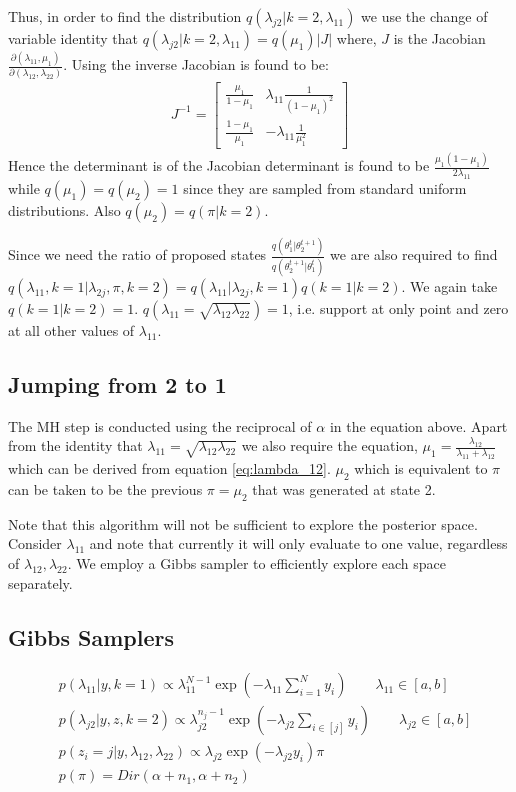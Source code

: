 \documentclass{article}
\begin{document}
Thus, in order to find the distribution $q(\lambda_{j2}\vert k=2,\lambda_{11})$ we use the change of variable identity that $q(\lambda_{j2}\vert k=2,\lambda_{11})=q(\mu_1)\vert J\vert$ where, $J$ is the Jacobian $\frac{\partial(\lambda_{11},\mu_1)}{\partial(\lambda_{12},\lambda_{22})}$. Using  the inverse Jacobian is found to be:
\begin{align}
J^{-1}=\begin{bmatrix}
\frac{\mu_1}{1-\mu_1} & \lambda_{11}\frac{1}{(1-\mu_1)^2}\\
\frac{1-\mu_1}{\mu_1} & -\lambda_{11}\frac{1}{\mu_1^2}
\end{bmatrix}
\end{align}
Hence the determinant is of the Jacobian determinant is found to be $\frac{\mu_1(1-\mu_1)}{2\lambda_{11}}$ while $q(\mu_1)=q(\mu_2)=1$ since they are sampled from standard uniform distributions. Also $q(\mu_2)=q(\pi\vert k=2)$.

Since we need the ratio of proposed states $ \frac{q(\theta_1^t|\theta_2^{t+1})}{q(\theta_2^{t+1}|\theta_1^{t})} $ we are also required to find $ q(\lambda_{11},k=1\vert\lambda_{2j},\pi,k=2) = q(\lambda_{11}\vert\lambda_{2j},k=1) q(k=1 \vert k=2) $. We again take $ q(k=1\vert k=2)=1 $. $q(\lambda_{11}=\sqrt{\lambda_{12}\lambda_{22}})=1$, i.e. support at only point and zero at all other values of $\lambda_{11}$.
 
\subsection{Jumping from 2 to 1}
The MH step is conducted using the reciprocal of $\alpha$ in the equation above. Apart from the identity that $\lambda_{11}=\sqrt{\lambda_{12}\lambda_{22}}$ we also require the equation, $\mu_1=\frac{\lambda_{12}}{\lambda_{11}+\lambda_{12}}$ which can be derived from equation \ref{eq:lambda_12}. $\mu_2$ which is equivalent to $\pi$ can be taken to be the previous $\pi=\mu_2$ that was generated at state 2.

Note that this algorithm will not be sufficient to explore the posterior space. Consider $\lambda_{11}$ and note that currently it will only evaluate to one value, regardless of $\lambda_{12}, \lambda_{22}$. We employ a Gibbs sampler to efficiently explore each space separately.

\subsection{Gibbs Samplers}
\begin{align}
& p(\lambda_{11}|y,k=1) \propto \lambda_{11}^{N-1}\exp(-\lambda_{11}\sum_{i=1}^{N}y_i)\qquad \lambda_{11}\in[a,b]\\
& p(\lambda_{j2}|y,z,k=2) \propto \lambda_{j2}^{n_j-1}\exp(-\lambda_{j2}\sum_{i\in[j]}y_i)\qquad \lambda_{j2}\in[a,b]\\
& p(z_i=j|y,\lambda_{12},\lambda_{22}) \propto \lambda_{j2}\exp(-\lambda_{j2}y_i)\pi\\
& p(\pi) = Dir(\alpha+n_1,\alpha+n_2)
\end{align}
\end{document}
